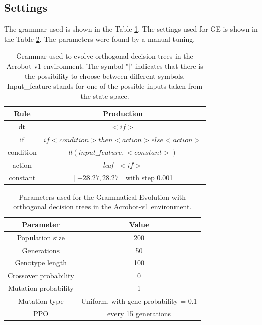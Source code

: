 \subsection{Settings}
\label{subsec:422}
The grammar used is shown in the Table \ref{table:5}. The settings used for GE is shown in the Table \ref{table:6}. The parameters were found by a manual tuning.


\captionsetup{margin=2cm}
\begin{table}[h!]
\begin{center}
\begin{tabular}{ |c|c| }
\hline
\textbf{Rule} & \textbf{Production} \\
\hline
dt & \textit{$< if >$}\\
if & \textit{$if < condition > then < action > else < action >$}\\
condition & \textit{lt$(input\_feature,<constant>)$}\\
action & \textit{leaf $| < if >$}\\
constant & $[-28.27, 28.27]$ with step 0.001\\
\hline
\end{tabular}
\caption{Grammar used to evolve orthogonal decision trees in the Acrobot-v1 environment. The symbol "$|$" indicates that there is the possibility to choose between different symbols. Input\_feature stands for one of the possible inputs taken from the state space.}
\label{table:5}
\end{center}
\end{table}


\begin{table}[h!]
\begin{center}
\begin{tabular}{ |c|c| } 
\hline
\textbf{Parameter} & \textbf{Value} \\
\hline
Population size & 200\\
Generations & 50\\
Genotype length & 100\\
Crossover probability & 0\\
Mutation probability & 1\\
Mutation type & Uniform, with gene probability = 0.1\\
PPO & every 15 generations\\
\hline
\end{tabular}
\caption{Parameters used for the Grammatical Evolution with orthogonal decision trees in the Acrobot-v1 environment.}
\label{table:6}
\end{center}
\end{table}


